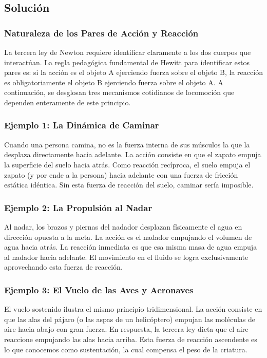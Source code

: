 \documentclass[12pt]{article}
\begin{document}
\subsection*{Solución}

\subsubsection*{Naturaleza de los Pares de Acción y Reacción}
La tercera ley de Newton requiere identificar claramente a los dos cuerpos que interactúan. La regla pedagógica fundamental de Hewitt para identificar estos pares es: si la acción es el objeto A ejerciendo fuerza sobre el objeto B, la reacción es obligatoriamente el objeto B ejerciendo fuerza sobre el objeto A. A continuación, se desglosan tres mecanismos cotidianos de locomoción que dependen enteramente de este principio.

\subsubsection*{Ejemplo 1: La Dinámica de Caminar}
Cuando una persona camina, no es la fuerza interna de sus músculos la que la desplaza directamente hacia adelante. La acción consiste en que el zapato empuja la superficie del suelo hacia atrás. Como reacción recíproca, el suelo empuja el zapato (y por ende a la persona) hacia adelante con una fuerza de fricción estática idéntica. Sin esta fuerza de reacción del suelo, caminar sería imposible.

\subsubsection*{Ejemplo 2: La Propulsión al Nadar}
Al nadar, los brazos y piernas del nadador desplazan físicamente el agua en dirección opuesta a la meta. La acción es el nadador empujando el volumen de agua hacia atrás. La reacción inmediata es que esa misma masa de agua empuja al nadador hacia adelante. El movimiento en el fluido se logra exclusivamente aprovechando esta fuerza de reacción.

\subsubsection*{Ejemplo 3: El Vuelo de las Aves y Aeronaves}
El vuelo sostenido ilustra el mismo principio tridimensional. La acción consiste en que las alas del pájaro (o las aspas de un helicóptero) empujan las moléculas de aire hacia abajo con gran fuerza. En respuesta, la tercera ley dicta que el aire reaccione empujando las alas hacia arriba. Esta fuerza de reacción ascendente es lo que conocemos como sustentación, la cual compensa el peso de la criatura.
\end{document}
